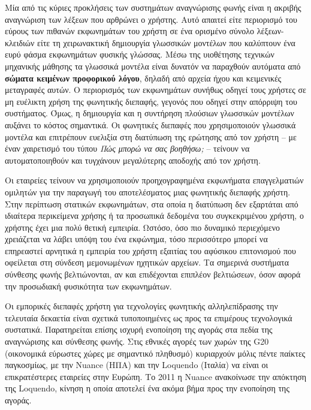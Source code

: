 \documentclass[]{../../metanetpaper}
\begin{document}
\begin{multicols}{2}
Μία από τις κύριες προκλήσεις των συστημάτων αναγνώρισης φωνής είναι η ακριβής αναγνώριση των λέξεων που αρθρώνει ο χρήστης. Αυτό απαιτεί είτε περιορισμό του εύρους των πιθανών εκφωνημάτων του χρήστη σε ένα ορισμένο σύνολο λέξεων-κλειδιών είτε τη χειρωνακτική δημιουργία γλωσσικών μοντέλων που καλύπτουν ένα ευρύ φάσμα εκφωνημάτων φυσικής γλώσσας. Μέσω της υιοθέτησης τεχνικών μηχανικής μάθησης τα γλωσσικά μοντέλα είναι δυνατόν να παραχθούν αυτόματα από  \textbf{σώματα κειμένων προφορικού λόγου}, δηλαδή από αρχεία ήχου και κειμενικές μεταγραφές αυτών. Ο περιορισμός των εκφωνημάτων συνήθως οδηγεί τους χρήστες σε μη ευέλικτη χρήση της φωνητικής διεπαφής, γεγονός που οδηγεί στην απόρριψη του συστήματος. Όμως, η δημιουργία και η συντήρηση πλούσιων γλωσσικών μοντέλων αυξάνει το κόστος σημαντικά. Οι φωνητικές διεπαφές που χρησιμοποιούν γλωσσικά μοντέλα και επιτρέπουν ευελιξία στη διατύπωση της ερώτησης από τον  χρήστη  – με έναν χαιρετισμό  του τύπου \textit{Πώς μπορώ να σας βοηθήσω;} – τείνουν να αυτοματοποιηθούν και τυγχάνουν μεγαλύτερης αποδοχής από τον χρήστη.


Οι εταιρείες τείνουν να χρησιμοποιούν προηχογραφημένα εκφωνήματα επαγγελματιών ομιλητών για την παραγωγή του αποτελέσματος μιας φωνητικής διεπαφής χρήστη. Στην περίπτωση  στατικών εκφωνημάτων, στα οποία η διατύπωση δεν εξαρτάται από ιδιαίτερα περικείμενα χρήσης ή τα προσωπικά δεδομένα του συγκεκριμένου χρήστη, ο χρήστης έχει μια πολύ θετική εμπειρία. Ωστόσο, όσο πιο δυναμικό περιεχόμενο χρειάζεται να λάβει υπόψη του ένα εκφώνημα, τόσο περισσότερο μπορεί να επηρεαστεί αρνητικά η εμπειρία του χρήστη εξαιτίας του αφύσικου επιτονισμού που  οφείλεται στη σύνδεση μεμονωμένων ηχητικών αρχείων. Τα σημερινά συστήματα σύνθεσης φωνής βελτιώνονται, αν και επιδέχονται επιπλέον βελτιώσεων, όσον αφορά την προσωδιακή φυσικότητα των εκφωνημάτων.

Οι εμπορικές διεπαφές χρήστη για τεχνολογίες φωνητικής αλληλεπίδρασης την τελευταία δεκαετία είναι σχετικά τυποποιημένες ως προς τα επιμέρους τεχνολογικά συστατικά. Παρατηρείται επίσης ισχυρή ενοποίηση της αγοράς στα πεδία της αναγνώρισης και σύνθεσης φωνής. Στις εθνικές αγορές των χωρών της G20 (οικονομικά εύρωστες χώρες με σημαντικό πληθυσμό) κυριαρχούν μόλις πέντε παίκτες παγκοσμίως, με την Nuance (ΗΠΑ) και την Loquendo (Ιταλία) να είναι οι επικρατέστερες εταιρείες  στην Ευρώπη. Το 2011 η Nuance ανακοίνωσε την απόκτηση της Loquendo, κίνηση η οποία αποτελεί ένα ακόμα βήμα προς την ενοποίηση της αγοράς.


\end{multicols}
\end{document}
